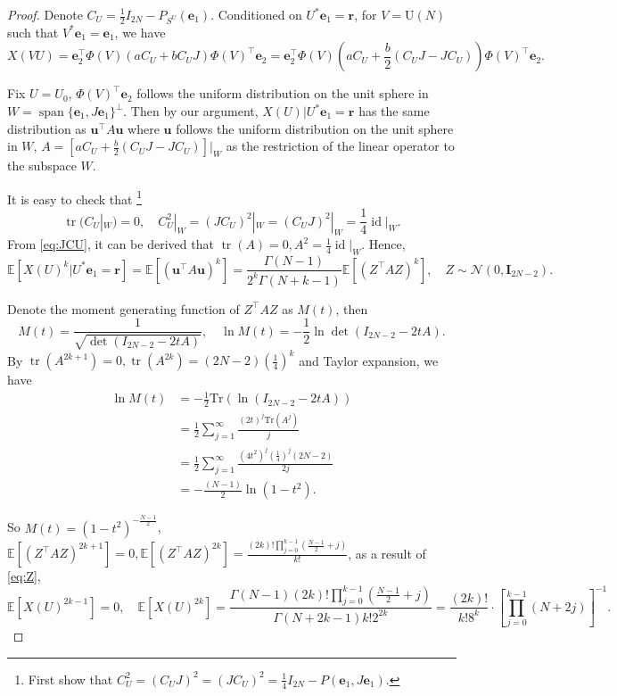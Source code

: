 \documentclass{amsart}
\theoremstyle{plain}
\theoremstyle{definition}
\theoremstyle{remark}
\newcommand{\EE}{\mathbb{E}}
\begin{document}
\begin{proof}
    
Denote $C_U=\frac{1}{2}I_{2N}-P_{S^U}(\bm e_1)$.
 Conditioned on $U^*\bm e_{1}=\bm r$, for $V=\mathrm U(N)$ such that $V^*\bm e_1=\bm e_1$, we have 
 \[X(VU)=\bm e_2^\top \Phi(V) (aC_U+bC_UJ)\Phi(V)^\top \bm e_2=\bm e_2^\top \Phi(V)\left (aC_U+\frac{b}{2}(C_UJ-JC_U)\right)\Phi(V)^\top \bm e_2.\]
 
 Fix $U=U_0$, $\Phi(V)^\top \bm e_2$ follows the uniform distribution on the unit sphere in $W=\operatorname{span}\{\bm e_1, J\bm e_1\}^\perp$.
  Then by our argument, $X(U)|U^*\bm e_1=\bm r$ has the same distribution as $\bm u^\top A \bm u$ where $\bm u$ follows the uniform distribution on the unit sphere in $W$, $A=[aC_U+\frac{b}{2}(C_UJ-JC_U)]|_W$  as the restriction of the linear operator to the subspace $W$. 
  
  It is easy to check that \footnote{First show that $C_U^2=(C_UJ)^2=(JC_U)^2=\frac{1}{4}I_{2N}-P(\bm e_1,J\bm e_1)$.}
 \begin{equation}
 \label{eq:JCU}
  \operatorname{tr}(C_U|_W)=0,\quad C_U^2|_W=(JC_U)^2|_W=(C_U J)^2|_W=\frac{1}{4}\operatorname{id}|_W.
 \end{equation}
 From \eqref{eq:JCU}, it can be derived that $\operatorname{tr}(A)=0,A^2=\frac{1}{4}\operatorname{id}|_W$. Hence, 
 \begin{equation}
 \label{eq:Z}
\EE[X(U)^k|U^*\bm e_1=\bm r]=\EE[(\bm u^\top A \bm u)^k]=\frac{\Gamma(N-1)}{2^k\Gamma(N+k-1)} \mathbb{E}[(Z^\top AZ)^k],\quad Z\sim \mathcal N(0,\bm I_{2N-2}).
 \end{equation}

Denote the moment generating function of $Z^\top AZ$ as $M(t)$, then 
\[M(t)=\frac{1}{\sqrt{\operatorname{det}(I_{2N-2}-2tA)}},\quad \ln M(t) = -\frac{1}{2} \ln \det(I_{2N-2} - 2tA).\]
By $\operatorname{tr}(A^{2k+1})=0, \operatorname{tr}(A^{2k})=(2N-2)(\frac{1}{4})^k$ and Taylor expansion, we have
\begin{align*}
\ln M(t) &= -\frac{1}{2} \mathrm{Tr}\left( \ln(I_{2N-2} - 2tA) \right)\\
&= \frac{1}{2} \sum_{j=1}^{\infty} \frac{(2t)^j \mathrm{Tr}(A^j)}{j}\\
&=\frac{1}{2}\sum\limits_{j=1}^{\infty}\frac{(4t^2)^j(\frac{1}{4})^j(2N-2)}{2j}\\
&=-\frac{(N-1)}{2}\ln(1-t^2). 
\end{align*}

So $M(t)=(1-t^2)^{-\frac{N-1}{2}}$, $\mathbb{E}[(Z^\top AZ)^{2k+1}]=0,\mathbb{E}[(Z^\top AZ)^{2k}]=\frac{(2k)!\prod_{j=0}^{k-1} \left(\frac{N-1}{2} + j \right)}{k!}$, as a result of \eqref{eq:Z},
\begin{equation}
\label{eq:XU}
    \EE[X(U)^{2k-1}]=0,\quad \EE[X(U)^{2k}]=
    \frac{\Gamma(N-1)(2k)!\prod_{j=0}^{k-1} \left( \frac{N-1}{2} + j \right)}{\Gamma(N+2k-1)k!2^{2k}}=
    \frac{(2k)!}{k!8^k}\cdot\left[\prod_{j=0}^{k-1}(N+2j)\right]^{-1}.
\end{equation}
\end{proof}
\end{document}
